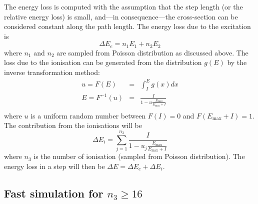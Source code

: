 \documentclass{article}
\newcommand{\Emax}{\ensuremath{E_{\mathrm{max}}}}
\begin{document}
The energy loss is computed with the assumption that the step length
(or the relative energy loss) is small, and---in consequence---the
cross-section can be considered constant along the path length.  The
energy loss due to the excitation is
\begin{equation}
\Delta E_e = n_1 E_1 + n_2 E_2
\end{equation}
where $n_1$ and $n_2$ are sampled from Poisson distribution as
discussed above.  The loss due to the ionisation can be generated from
the distribution $g(E)$ by the inverse transformation method:
\begin{eqnarray}
u = F(E) &  = & \int_{I}^E g(x) dx \nonumber \\
E = F^{-1}(u) & = & \frac{I}{1 - u \frac {\Emax}{\Emax+I}} \\
\end{eqnarray}
where $u$ is a uniform random number between $F(I)=0$ and
$F(\Emax+I)=1$.  The contribution from the ionisations will be
\begin{equation}
\Delta E_i  = \sum_{j=1}^{n_3} \frac{I}
              {1 - u_j \frac {\Emax}{\Emax + I}}
\end{equation}
where $n_3$ is the number of ionisation (sampled from Poisson
distribution). The energy loss in a step will then be $\Delta E =
\Delta E_e + \Delta E_i$.


\subsection{Fast simulation for $n_3 \geq 16$}
\end{document}
